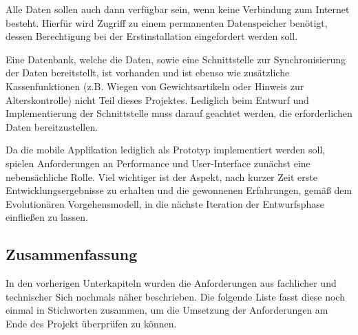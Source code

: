 Alle Daten sollen auch dann verfügbar sein, wenn keine Verbindung zum Internet besteht. Hierfür wird Zugriff zu einem permanenten Datenspeicher benötigt, dessen Berechtigung bei der Erstinstallation eingefordert werden soll.

Eine Datenbank, welche die Daten, sowie eine Schnittstelle zur Synchronisierung der Daten bereitstellt, ist vorhanden und ist ebenso wie zusätzliche Kassenfunktionen (z.B. Wiegen von Gewichtsartikeln oder Hinweis zur Alterskontrolle) nicht Teil dieses Projektes. Lediglich beim Entwurf und Implementierung der Schnittstelle muss darauf geachtet werden, die erforderlichen Daten bereitzustellen.

Da die mobile Applikation lediglich als Prototyp implementiert werden soll, spielen Anforderungen an Performance und User-Interface zunächst eine nebensächliche Rolle. Viel wichtiger ist der Aspekt, nach kurzer Zeit erste Entwicklungsergebnisse zu erhalten und die gewonnenen Erfahrungen, gemäß dem Evolutionären Vorgehensmodell, in die nächste Iteration der Entwurfsphase einfließen zu lassen.

\subsection{Zusammenfassung}
In den vorherigen Unterkapiteln wurden die Anforderungen aus fachlicher und technischer Sich nochmals näher beschrieben. Die folgende Liste fasst diese noch einmal in Stichworten zusammen, um die Umsetzung der Anforderungen am Ende des Projekt überprüfen zu können.


